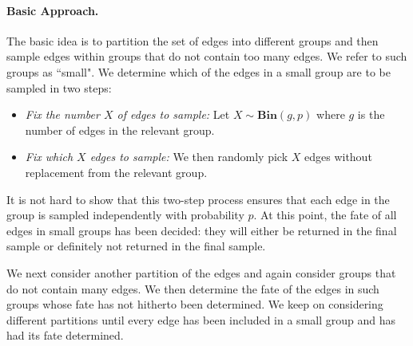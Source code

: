 \documentclass[11pt]{article}
\newcommand{\bin}{{\mathbf{Bin}}}
\begin{document}
\paragraph{Basic Approach.} 
The basic idea is to partition the set of edges into different groups and then sample edges within groups that do not contain too many edges. We refer to such groups as ``small". We determine which of the edges in a small group are to be sampled in two steps:
\begin{itemize}
\item {\em Fix the number $X$ of edges to sample:} Let $X\sim \bin(g,p)$ where $g$ is the number of edges in the relevant group.
\item {\em Fix which $X$ edges to sample:} We then randomly pick $X$ edges without replacement from the relevant group.
\end{itemize}
It is not hard to show that this two-step process ensures that each edge in the group is sampled independently with probability $p$. At this point, the fate of all edges in small groups has been decided: they will either be returned in the final sample or definitely not returned in the final sample. 

We next consider another partition of the edges and again consider groups that do not contain many edges. We then determine the fate of the edges in such groups whose fate has not hitherto  been  determined. We keep on considering different partitions until every edge has been included in a small group and has had its fate determined. 
\end{document}
